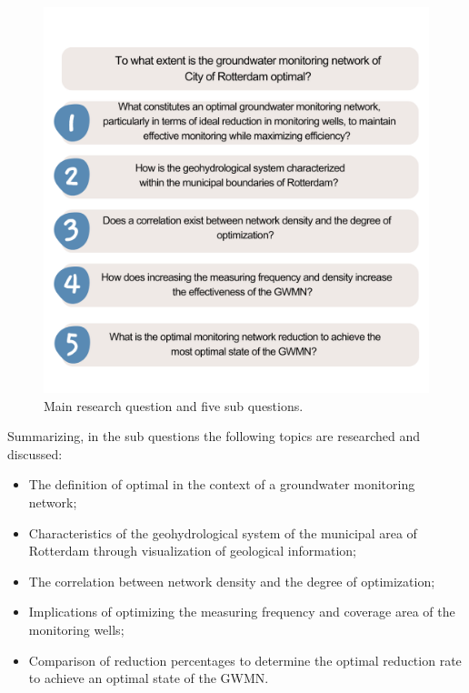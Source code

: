\begin{figure}[htbp]
    \centering
    \includegraphics[width=0.75\linewidth]{figures/rq's-7.png}
    \caption{Main research question and five sub questions.}
    \label{Research questions}
\end{figure}
Summarizing, in the sub questions the following topics are researched and discussed: 
\begin{itemize}
    \item The definition of optimal in the context of a groundwater monitoring network;
    \item Characteristics of the geohydrological system of the municipal area of Rotterdam through visualization of geological information;
    \item The correlation between network density and the degree of optimization;
    \item Implications of optimizing the measuring frequency and coverage area of the monitoring wells;
    \item Comparison of reduction percentages to determine the optimal reduction rate to achieve an optimal state of the GWMN.

\end{itemize}

\newpage

